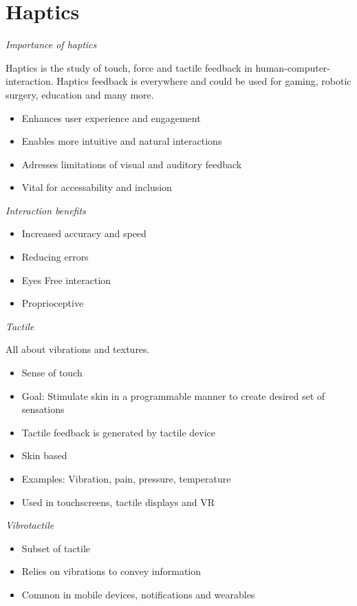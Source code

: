 \section{Haptics}

\textit{Importance of haptics}

Haptics is the study of touch, force and tactile feedback in human-computer-interaction. 
Haptics feedback is everywhere and could be used for gaming, robotic surgery, education and many more. 

\begin{itemize}[itemsep=-5pt, topsep=0pt, leftmargin=*]
	\item Enhances user experience and engagement
	\item Enables more intuitive and natural interactions
	\item Adresses limitations of visual and auditory feedback
	\item Vital for accessability and inclusion
\end{itemize}\medskip



\textit{Interaction benefits}  \smallskip
\begin{itemize}[itemsep=-5pt, topsep=0pt, leftmargin=*]
	\item Increased accuracy and speed
	\item Reducing errors
	\item Eyes Free interaction
	\item Proprioceptive
\end{itemize} \medskip

\textit{Tactile} \smallskip

All about vibrations and textures.

\begin{itemize}[itemsep=-5pt, topsep=0pt, leftmargin=*]
	\item Sense of touch
	\item Goal: Stimulate skin in a programmable manner to create desired set of sensations
	\item Tactile feedback is generated by tactile device
	\item Skin based
	\item Examples: Vibration, pain, pressure, temperature
	\item Used in touchscreens, tactile displays and VR
\end{itemize}


\textit{Vibrotactile} \smallskip

\begin{itemize}[itemsep=-5pt, topsep=0pt, leftmargin=*]
	\item Subset of tactile
	\item Relies on vibrations to convey information
	\item Common in mobile devices, notifications and wearables
\end{itemize}


